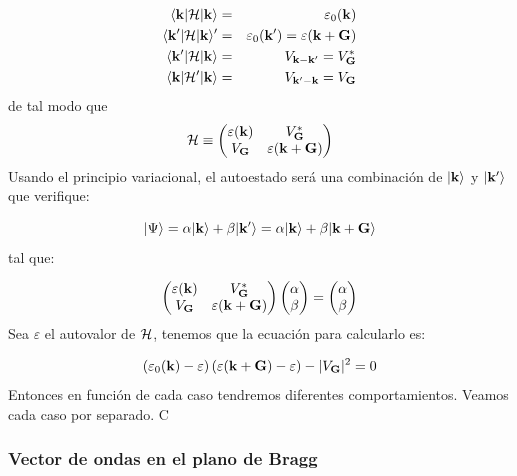 \begin{eqnarray*}
	\langle \mathbf{k} | \mathcal{H} |\mathbf{k} \rangle &= & \varepsilon_0(\mathbf{k}) \\	
	\langle \mathbf{k}' | \mathcal{H} |\mathbf{k} \rangle' &= & \varepsilon_0(\mathbf{k}')=\varepsilon(\mathbf{k}+\mathbf{G}) \\	
	\langle \mathbf{k}' | \mathcal{H} |\mathbf{k} \rangle &= & V_{\mathbf{k}-\mathbf{k}'}=V_{\mathbf{G}}^* \\	
	\langle \mathbf{k} | \mathcal{H}' |\mathbf{k} \rangle &= & V_{\mathbf{k}'-\mathbf{k}}=V_{\mathbf{G}}
\end{eqnarray*}
de tal modo que 
\begin{equation}
	\mathcal{H} \equiv \begin{pmatrix}
		\varepsilon(\mathbf{k}) & V_{\mathbf{G}}^* \\ 
		V_{\mathbf{G}} & \varepsilon(\mathbf{k}+\mathbf{G})
	\end{pmatrix}
\end{equation}
Usando el principio variacional, el autoestado será una combinación de $|\mathbf{k}\rangle$ y $|\mathbf{k}'\rangle$ que verifique:

\begin{equation}
|\Psi \rangle = \alpha |\mathbf{k} \rangle + \beta |\mathbf{k}'\rangle = \alpha |\mathbf{k} \rangle + \beta |\mathbf{k}+\mathbf{G}\rangle 
\end{equation}
tal que:

\begin{equation}\begin{pmatrix}
	\varepsilon(\mathbf{k}) & V_{\mathbf{G}}^* \\ 
	V_{\mathbf{G}} & \varepsilon(\mathbf{k}+\mathbf{G})
\end{pmatrix} \begin{pmatrix}
	\alpha \\ \beta
\end{pmatrix} = \begin{pmatrix}
	\alpha \\ \beta
\end{pmatrix} 
\end{equation}
Sea $\varepsilon$ el autovalor de $\mathcal{H}$, tenemos que la ecuación para calcularlo es:

\begin{equation}
	\left( \varepsilon_0(\mathbf{k})-\varepsilon \right)\left( \varepsilon(\mathbf{k}+\mathbf{G})-\varepsilon \right) - |V_{\mathbf{G}}|^2 = 0
\end{equation}
Entonces en función de cada caso tendremos diferentes comportamientos. Veamos cada caso por separado. C

\subsubsection{Vector de ondas en el plano de Bragg}

